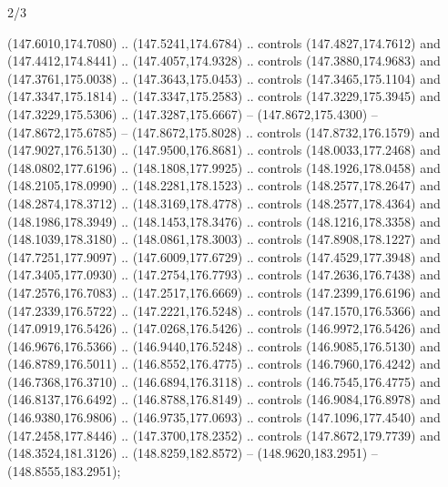 \begin{flagdescription}{2/3}
\begin{scope}[shift={(0.5\flaglength,0.5)},scale=\flagwidth/320]
\begin{scope}[y=0.8pt, x=0.8pt, yscale=-1,shift={(-118.3,-146)}]
  (147.6010,174.7080) .. (147.5241,174.6784) .. controls (147.4827,174.7612) and
  (147.4412,174.8441) .. (147.4057,174.9328) .. controls (147.3880,174.9683) and
  (147.3761,175.0038) .. (147.3643,175.0453) .. controls (147.3465,175.1104) and
  (147.3347,175.1814) .. (147.3347,175.2583) .. controls (147.3229,175.3945) and
  (147.3229,175.5306) .. (147.3287,175.6667) -- (147.8672,175.4300) --
  (147.8672,175.6785) -- (147.8672,175.8028) .. controls (147.8732,176.1579) and
  (147.9027,176.5130) .. (147.9500,176.8681) .. controls (148.0033,177.2468) and
  (148.0802,177.6196) .. (148.1808,177.9925) .. controls (148.1926,178.0458) and
  (148.2105,178.0990) .. (148.2281,178.1523) .. controls (148.2577,178.2647) and
  (148.2874,178.3712) .. (148.3169,178.4778) .. controls (148.2577,178.4364) and
  (148.1986,178.3949) .. (148.1453,178.3476) .. controls (148.1216,178.3358) and
  (148.1039,178.3180) .. (148.0861,178.3003) .. controls (147.8908,178.1227) and
  (147.7251,177.9097) .. (147.6009,177.6729) .. controls (147.4529,177.3948) and
  (147.3405,177.0930) .. (147.2754,176.7793) .. controls (147.2636,176.7438) and
  (147.2576,176.7083) .. (147.2517,176.6669) .. controls (147.2399,176.6196) and
  (147.2339,176.5722) .. (147.2221,176.5248) .. controls (147.1570,176.5366) and
  (147.0919,176.5426) .. (147.0268,176.5426) .. controls (146.9972,176.5426) and
  (146.9676,176.5366) .. (146.9440,176.5248) .. controls (146.9085,176.5130) and
  (146.8789,176.5011) .. (146.8552,176.4775) .. controls (146.7960,176.4242) and
  (146.7368,176.3710) .. (146.6894,176.3118) .. controls (146.7545,176.4775) and
  (146.8137,176.6492) .. (146.8788,176.8149) .. controls (146.9084,176.8978) and
  (146.9380,176.9806) .. (146.9735,177.0693) .. controls (147.1096,177.4540) and
  (147.2458,177.8446) .. (147.3700,178.2352) .. controls (147.8672,179.7739) and
  (148.3524,181.3126) .. (148.8259,182.8572) -- (148.9620,183.2951) --
  (148.8555,183.2951);


\end{scope}
\end{scope}
\end{flagdescription}
